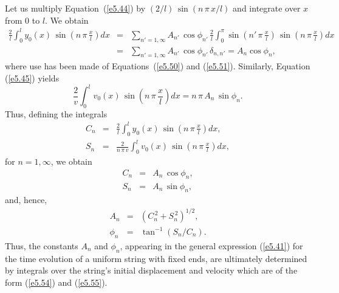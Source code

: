Let us multiply Equation~(\ref{e5.44}) by $(2/l)\,\sin (n\,\pi\,x/l)$ and integrate over $x$
from $0$ to $l$. We obtain
\begin{eqnarray}
\frac{2}{l}\int_0^l y_0(x)\,\sin\left(n\,\pi\,\frac{x}{l}\right)dx
&=&\sum_{n'=1,\infty} \!\!\!A_{n'}\,\cos\phi_{n'}\,\frac{2}{l}\int_0^\pi\sin\left(n'\,\pi\,\frac{x}{l}\right)\,\sin\left(n\,\pi\,\frac{x}{l}\right)dx\nonumber\\[0.5ex]
&=&\sum_{n'=1,\infty} A_{n'}\,\cos\phi_{n'}\,\delta_{n,n'}
= A_n\cos\phi_n,
\end{eqnarray}
where use has been made of Equations~(\ref{e5.50}) and (\ref{e5.51}). 
Similarly, Equation (\ref{e5.45}) yields
\begin{equation}
\frac{2}{v}\int_0^l v_0(x)\,\sin\left(n\,\pi\,\frac{x}{l}\right)dx = n\,\pi \,A_n\,\sin\phi_n.
\end{equation}
Thus, defining the integrals
\begin{eqnarray}\label{e5.54}
C_n &=& \frac{2}{l}\int_0^l y_0(x)\,\sin\left(n\,\pi\,\frac{x}{l}\right)dx,\\[0.5ex]
S_n &=& \frac{2}{n\,\pi\,v}\int_0^l v_0(x)\,\sin\left(n\,\pi\,\frac{x}{l}\right)dx,\label{e5.55}
\end{eqnarray}
for $n=1,\infty$, we obtain
\begin{eqnarray}
C_n &=& A_n\,\cos\phi_n,\\[0.5ex]
S_n &=& A_n\,\sin\phi_n,
\end{eqnarray}
and, hence, 
\begin{eqnarray}\label{e5.58}
A_n &=& (C_n^{\,2} + S_n^{\,2})^{1/2},\\[0.5ex]
\phi_n &=& \tan^{-1}(S_n/C_n).\label{e5.59}
\end{eqnarray}
Thus, the constants $A_n$ and $\phi_n$, appearing in the general expression (\ref{e5.41}) for the time evolution of a uniform string with fixed ends, are
ultimately
determined by integrals over the string's initial displacement and velocity which are of the form
(\ref{e5.54}) and (\ref{e5.55}).


